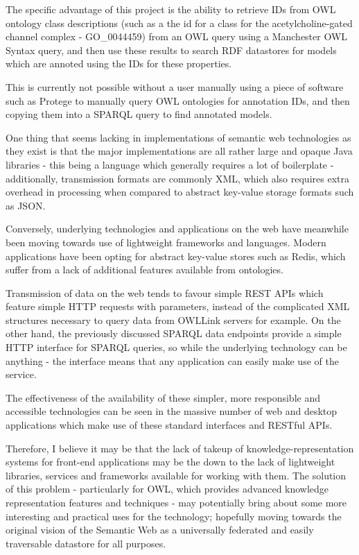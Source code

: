 \documentclass{article}
\begin{document}
The specific advantage of this project is the ability to retrieve IDs from
OWL ontology class descriptions (such as a the id for a class for the
acetylcholine-gated channel complex - GO\_0044459) from an OWL query using a
Manchester OWL Syntax query, and then use these results to search RDF
datastores for models which are annoted using the IDs for these properties.

This is currently not possible without a user manually using a piece of software
such as Protege to manually query OWL ontologies for annotation IDs, and then
copying them into a SPARQL query to find annotated models.


One thing that seems lacking in implementations of semantic web technologies as
they exist is that the major implementations are all rather large and opaque
Java libraries - this being a language which generally requires a lot of
boilerplate - additionally, transmission formats are commonly XML, which also
requires extra overhead in processing when compared to abstract key-value
storage formats such as JSON. 

Conversely, underlying technologies and applications on the web have meanwhile 
been moving towards use of lightweight frameworks and languages. Modern applications 
have been opting for abstract key-value stores such as Redis, which suffer from
a lack of additional features available from ontologies. 

Transmission of data on the web tends to favour simple REST APIs which feature 
simple HTTP requests with parameters\cite{rest}, instead of the complicated XML structures 
necessary to query data from OWLLink servers for example. On the other hand, the
previously discussed SPARQL data endpoints provide a simple HTTP interface for
SPARQL queries, so while the underlying technology can be anything - the
interface means that any application can easily make use of the service.

The effectiveness of the availability of these simpler, more responsible and 
accessible 
technologies\cite{uptake} can be seen in the massive number of web and desktop applications
which make use of these standard interfaces and RESTful APIs. 

Therefore, I believe it may be that the lack of takeup of knowledge-representation systems
for front-end applications may be the down to the lack of lightweight libraries, 
services and frameworks available for working with them. The solution of this
problem - particularly for OWL, which provides advanced knowledge representation
features and techniques - may potentially bring about some more interesting and
practical uses for the technology; hopefully moving towards the original vision
of the Semantic Web as a universally federated and easily traversable datastore
for all purposes.
\end{document}

